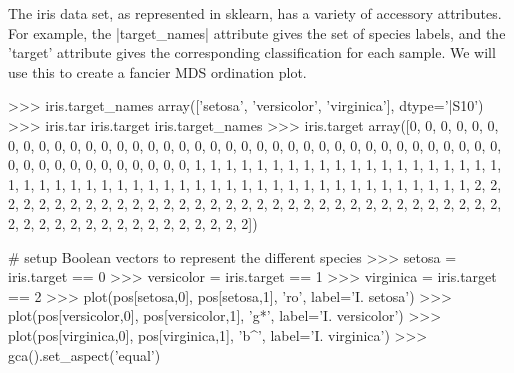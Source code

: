 The iris data set, as represented in sklearn, has a variety of accessory attributes.  For example, the |target_names| attribute gives the set of species labels, and the 'target' attribute gives the corresponding classification for each sample.  We will use this to create a fancier MDS ordination plot.
%
\begin{python}
>>> iris.target_names
array(['setosa', 'versicolor', 'virginica'], 
      dtype='|S10')
>>> iris.tar
iris.target        iris.target_names  
>>> iris.target
array([0, 0, 0, 0, 0, 0, 0, 0, 0, 0, 0, 0, 0, 0, 0, 0, 0, 0, 0, 0, 0, 0, 0,
       0, 0, 0, 0, 0, 0, 0, 0, 0, 0, 0, 0, 0, 0, 0, 0, 0, 0, 0, 0, 0, 0, 0,
       0, 0, 0, 0, 1, 1, 1, 1, 1, 1, 1, 1, 1, 1, 1, 1, 1, 1, 1, 1, 1, 1, 1,
       1, 1, 1, 1, 1, 1, 1, 1, 1, 1, 1, 1, 1, 1, 1, 1, 1, 1, 1, 1, 1, 1, 1,
       1, 1, 1, 1, 1, 1, 1, 1, 2, 2, 2, 2, 2, 2, 2, 2, 2, 2, 2, 2, 2, 2, 2,
       2, 2, 2, 2, 2, 2, 2, 2, 2, 2, 2, 2, 2, 2, 2, 2, 2, 2, 2, 2, 2, 2, 2,
       2, 2, 2, 2, 2, 2, 2, 2, 2, 2, 2, 2])

# setup Boolean vectors to represent the different species
>>> setosa = iris.target == 0
>>> versicolor = iris.target == 1
>>> virginica = iris.target == 2
>>> plot(pos[setosa,0], pos[setosa,1], 'ro', label='I. setosa')
>>> plot(pos[versicolor,0], pos[versicolor,1], 'g*', label='I. versicolor')
>>> plot(pos[virginica,0], pos[virginica,1], 'b^', label='I. virginica')
>>> gca().set_aspect('equal')
\end{python}
